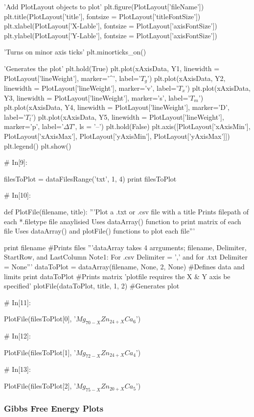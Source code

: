 \documentclass[a4paper,8pt]{article}
\begin{document}
\begin{python}
'Add PlotLayout objects to plot'
plt.figure(PlotLayout['fileName'])
plt.title(PlotLayout['title'], fontsize = PlotLayout['titleFontSize'])
plt.xlabel(PlotLayout['X-Lable'], fontsize = PlotLayout['axisFontSize'])
plt.ylabel(PlotLayout['Y-Lable'], fontsize = PlotLayout['axisFontSize'])

'Turns on minor axis ticks'
plt.minorticks_on()

'Generates the plot'
plt.hold(True)
plt.plot(xAxisData, Y1, linewidth = PlotLayout['lineWeight'],
marker='^', label='$T_{g}$')
plt.plot(xAxisData, Y2, linewidth = PlotLayout['lineWeight'],
marker='v', label='$T_{x}$')
plt.plot(xAxisData, Y3, linewidth = PlotLayout['lineWeight'],
marker='s', label='$T_{m}$')
plt.plot(xAxisData, Y4, linewidth = PlotLayout['lineWeight'],
marker='D', label='$T_{l}$')
plt.plot(xAxisData, Y5, linewidth = PlotLayout['lineWeight'],
marker='p', label='$\Delta T$', ls = '--')
plt.hold(False)
plt.axis([PlotLayout['xAxisMin'], PlotLayout['xAxisMax'], 
PlotLayout['yAxisMin'], PlotLayout['yAxisMax']])
plt.legend()
plt.show()


# In[9]:

filesToPlot = dataFilesRange('txt', 1, 4)
print filesToPlot


# In[10]:

def PlotFile(filename, title):
'''Plot a .txt or .csv file with a title
Prints filepath of each *.filetype file anaylisied 
Uses dataArray() function to print matrix of each file
Uses dataArray() and plotFile() functions to plot each file'''

print filename #Prints files
'''dataArray takes 4 arrguments; filename, Delimiter, StartRow, and LastColumn
Note1: For .csv Delimiter = ',' and for .txt Delimiter = None'''
dataToPlot = dataArray(filename, None, 2, None) #Defines data and limits
print dataToPlot #Prints matrix
'plotfile requires the X & Y axis be specified'
plotFile(dataToPlot, title, 1, 2) #Generates plot


# In[11]:

PlotFile(filesToPlot[0], '$Mg_{70-X}Zn_{24+X}Ca_{6}$')


# In[12]:

PlotFile(filesToPlot[1], '$Mg_{72-X}Zn_{24+X}Ca_{4}$')


# In[13]:

PlotFile(filesToPlot[2], '$Mg_{75-X}Zn_{20+X}Ca_{5}$')
\end{python}


\subsubsection{Gibbs Free Energy Plots}
\end{document}
